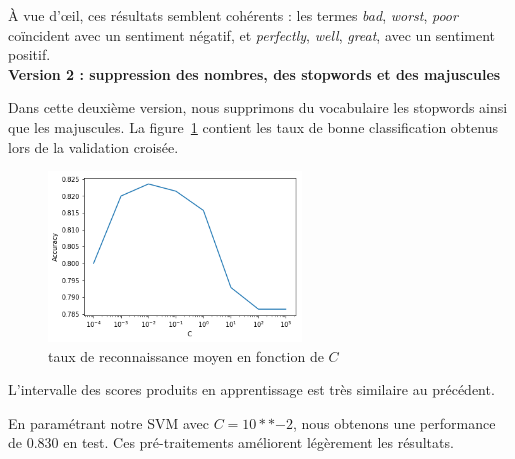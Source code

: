 \documentclass[a4paper]{article}
\newcommand{\figref}[1]{figure~\ref{#1}}
\begin{document}
\begin{table}[H]
\centering
{}
\caption{20 mots les plus polarisés}
\label{tab:tme3-task2-v0-w}
\end{table}

À vue d'œil, ces résultats semblent cohérents : les termes \emph{bad},
\emph{worst}, \emph{poor} coïncident avec un sentiment négatif, et
\emph{perfectly}, \emph{well}, \emph{great}, avec un sentiment positif. \\

\textbf{Version 2 : suppression des nombres, des stopwords et des majuscules}

Dans cette deuxième version, nous supprimons du vocabulaire les stopwords ainsi
que les majuscules. La \figref{img:tme2-task2-v1} contient les taux de bonne
classification obtenus lors de la validation croisée.

\begin{figure}[H]
	\center 
	\includegraphics[width=0.6\textwidth]{images/tme2/task2_v1.png}
    \caption{taux de reconnaissance moyen en fonction de $C$}
    \label{img:tme2-task2-v1}
\end{figure}

L'intervalle des scores produits en apprentissage est très similaire au
précédent.

En paramétrant notre SVM avec $C=10**{-2}$, nous obtenons une performance de
$0.830$ en test. Ces pré-traitements améliorent légèrement les résultats. \\
\end{document}
